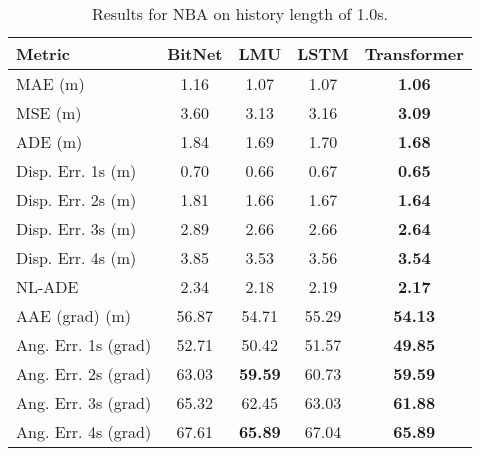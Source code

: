 \begin{table}[H]
\centering
\caption{Results for NBA on history length of 1.0s.}
\label{hist:NBA_1.0s}
\begin{tabular}{l||c|c|c|c}
Metric & BitNet & LMU & LSTM & Transformer \\
\hline \hline
MAE (m) & 1.16 & 1.07 & 1.07 & \textbf{1.06} \\
MSE (m) & 3.60 & 3.13 & 3.16 & \textbf{3.09} \\
ADE (m) & 1.84 & 1.69 & 1.70 & \textbf{1.68} \\
Disp. Err. 1s (m) & 0.70 & 0.66 & 0.67 & \textbf{0.65} \\
Disp. Err. 2s (m) & 1.81 & 1.66 & 1.67 & \textbf{1.64} \\
Disp. Err. 3s (m) & 2.89 & 2.66 & 2.66 & \textbf{2.64} \\
Disp. Err. 4s (m) & 3.85 & 3.53 & 3.56 & \textbf{3.54} \\
NL-ADE & 2.34 & 2.18 & 2.19 & \textbf{2.17} \\
AAE (grad) (m) & 56.87 & 54.71 & 55.29 & \textbf{54.13} \\
Ang. Err. 1s (grad) & 52.71 & 50.42 & 51.57 & \textbf{49.85} \\
Ang. Err. 2s (grad) & 63.03 & \textbf{59.59} & 60.73 & \textbf{59.59} \\
Ang. Err. 3s (grad) & 65.32 & 62.45 & 63.03 & \textbf{61.88} \\
Ang. Err. 4s (grad) & 67.61 & \textbf{65.89} & 67.04 & \textbf{65.89} \\
\end{tabular}
\end{table}

